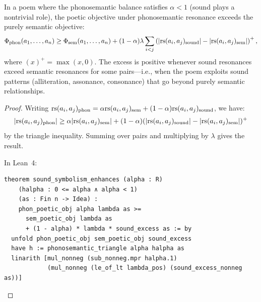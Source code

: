 \begin{theorem}
\label{thm:sound-symbolism}
In a poem where the phonosemantic balance satisfies $\alpha < 1$ (sound
plays a nontrivial role), the poetic objective under phonosemantic resonance
exceeds the purely semantic objective:
\[
  \Phi_{\text{phon}}(a_1, \ldots, a_n) \geq
  \Phi_{\text{sem}}(a_1, \ldots, a_n)
  + (1 - \alpha) \lambda \sum_{i < j}
  \left(|\mathrm{rs}(a_i, a_j)_{\text{sound}}|
  - |\mathrm{rs}(a_i, a_j)_{\text{sem}}|\right)^+,
\]
where $(x)^+ = \max(x, 0)$.  The excess is positive whenever sound
resonances exceed semantic resonances for some pairs---i.e., when the poem
exploits sound patterns (alliteration, assonance, consonance) that go
beyond purely semantic relationships.
\end{theorem}

\begin{proof}
Writing $\mathrm{rs}(a_i, a_j)_{\text{phon}} = \alpha \mathrm{rs}(a_i, a_j)_{\text{sem}}
+ (1-\alpha)\mathrm{rs}(a_i, a_j)_{\text{sound}}$, we have:
\[
  |\mathrm{rs}(a_i, a_j)_{\text{phon}}| \geq
  \alpha |\mathrm{rs}(a_i, a_j)_{\text{sem}}|
  + (1-\alpha)(|\mathrm{rs}(a_i, a_j)_{\text{sound}}|
  - |\mathrm{rs}(a_i, a_j)_{\text{sem}}|)^+
\]
by the triangle inequality.  Summing over pairs and multiplying by $\lambda$
gives the result.

In Lean~4:
\begin{lstlisting}
theorem sound_symbolism_enhances (alpha : R)
    (halpha : 0 <= alpha ∧ alpha < 1)
    (as : Fin n -> Idea) :
    phon_poetic_obj alpha lambda as >=
      sem_poetic_obj lambda as
      + (1 - alpha) * lambda * sound_excess as := by
  unfold phon_poetic_obj sem_poetic_obj sound_excess
  have h := phonosemantic_triangle alpha halpha as
  linarith [mul_nonneg (sub_nonneg.mpr halpha.1)
            (mul_nonneg (le_of_lt lambda_pos) (sound_excess_nonneg as))]
\end{lstlisting}
\end{proof}

